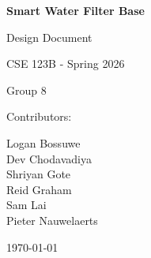 \documentclass[12pt]{article}
\begin{document}
\pagestyle{fancy}

\begin{titlepage}
    \centering
    \vspace*{2cm}
    
    {\Huge \bfseries Smart Water Filter Base \par}
    \vspace{0.5cm}
    {\Large Design Document \par}
    \vspace{2cm}
    {\Large CSE 123B - Spring 2026 \par}
    \vspace{1cm}
    {\Large Group 8 \par}
    \vspace{2cm}
    {\large Contributors:\par}
    \vspace{0.3cm}
    {\large
        Logan Bossuwe \\
        Dev Chodavadiya \\
        Shriyan Gote \\
        Reid Graham \\
        Sam Lai \\
        Pieter Nauwelaerts

    \par}
    \vfill
    {\large \today \par}
\end{titlepage}

\fancyfoot{}
\fancyhead{}
\fancyfoot[R]{\thepage}


        
\newpage
\tableofcontents                                    
\newpage


\end{document}
